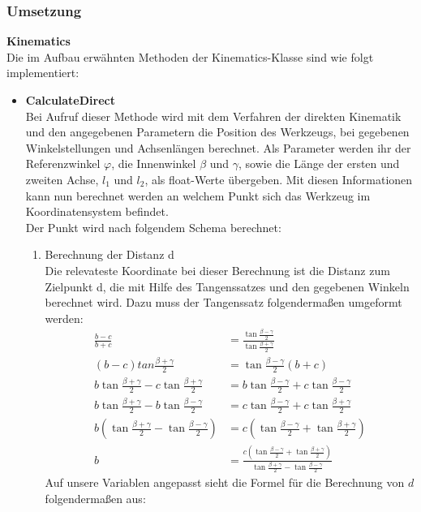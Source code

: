 \subsubsection{Umsetzung}
\textbf{Kinematics}\\
Die im Aufbau erwähnten Methoden der Kinematics-Klasse sind wie folgt implementiert:
\begin{itemize}
\item \textbf{CalculateDirect}\\
Bei Aufruf dieser Methode wird mit dem Verfahren der direkten Kinematik und den angegebenen Parametern die Position des Werkzeugs, bei gegebenen Winkelstellungen und Achsenlängen berechnet. Als Parameter werden ihr der Referenzwinkel $\varphi$, die Innenwinkel $\beta$ und $\gamma$, sowie die Länge der ersten und zweiten Achse, $l_1$ und $l_2$, als float-Werte übergeben. Mit diesen Informationen kann nun berechnet werden an welchem Punkt sich das Werkzeug im Koordinatensystem befindet.\\
Der Punkt wird nach folgendem Schema berechnet:
\begin{enumerate}
\item Berechnung der Distanz d\\
Die relevateste Koordinate bei dieser Berechnung ist die Distanz zum Zielpunkt d, die mit Hilfe des Tangenssatzes und den gegebenen Winkeln berechnet wird. Dazu muss der Tangenssatz folgendermaßen umgeformt werden:\\
\begin{align*}
\frac{b-c}{b+c} & = \frac{\tan \frac{\beta - \gamma}{2}}{\tan \frac{\beta + \gamma}{2}}\\
(b - c) tan \frac{\beta + \gamma}{2} & = \tan \frac{\beta - \gamma}{2}(b + c)\\
b \tan \frac{\beta + \gamma}{2} - c \tan \frac{\beta + \gamma}{2} & = b \tan \frac{\beta - \gamma}{2} + c \tan  \frac{\beta - \gamma}{2}\\
b \tan \frac{\beta + \gamma}{2} - b \tan \frac{\beta-\gamma}{2} & =  c \tan  \frac{\beta - \gamma}{2} + c \tan \frac{\beta + \gamma}{2}\\
b (\tan \frac{\beta + \gamma}{2} - \tan \frac{\beta-\gamma}{2}) & =  c (\tan  \frac{\beta - \gamma}{2} + \tan \frac{\beta + \gamma}{2})\\
b & = \frac{c (\tan  \frac{\beta - \gamma}{2} + \tan \frac{\beta + \gamma}{2})}{\tan \frac{\beta + \gamma}{2} - \tan \frac{\beta-\gamma}{2}}
\end{align*}
Auf unsere Variablen angepasst sieht die Formel für die Berechnung von $d$ folgendermaßen aus:

\end{enumerate}
\end{itemize}
